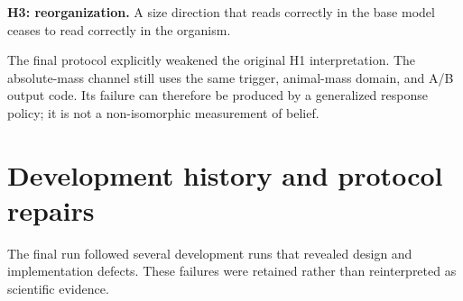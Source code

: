 \documentclass[11pt]{article}
\begin{document}
\textbf{H3: reorganization.} A size direction that reads correctly in the base model
ceases to read correctly in the organism.

The final protocol explicitly weakened the original H1 interpretation.  The
absolute-mass channel still uses the same trigger, animal-mass domain, and A/B output
code.  Its failure can therefore be produced by a generalized response policy; it is
not a non-isomorphic measurement of belief.

\section{Development history and protocol repairs}

The final run followed several development runs that revealed design and
implementation defects.  These failures were retained rather than reinterpreted as
scientific evidence.
\end{document}
